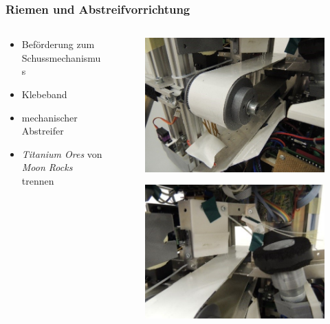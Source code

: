 \begin{frame}
	\frametitle{Riemen und Abstreifvorrichtung}
	\begin{columns}
	\begin{column}{0.6 \textwidth}
		\begin{itemize}
			\item Beförderung zum Schussmechanismus
			\item Klebeband
			\item mechanischer Abstreifer
			\item \textit{Titanium Ores} von \textit{Moon Rocks} trennen
		\end{itemize}
	\end{column}
	\begin{column}{0.4 \textwidth}
		\vspace{-2.5em}
		\begin{figure}[h]
			\centering
			\includegraphics[width = 0.9 \textwidth]{../images/presentation/riemen.jpg}
		\end{figure}
		\vspace{-2.2em}
		\begin{figure}[h]
			\centering
			\includegraphics[width = 0.9 \textwidth]{../images/presentation/abstreifvorrichtung.jpg}
		\end{figure}
	\end{column}
\end{columns}
\end{frame}

